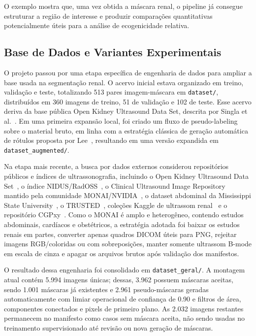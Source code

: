 \documentclass[12pt]{article}
\begin{document}
O exemplo mostra que, uma vez obtida a máscara renal, o pipeline já consegue estruturar a região de interesse e produzir comparações quantitativas potencialmente úteis para a análise de ecogenicidade relativa.

\subsection{Base de Dados e Variantes Experimentais}

O projeto passou por uma etapa específica de engenharia de dados para ampliar a base usada na segmentação renal. O acervo inicial estava organizado em treino, validação e teste, totalizando 513 pares imagem-máscara em \texttt{dataset/}, distribuídos em 360 imagens de treino, 51 de validação e 102 de teste. Esse acervo deriva da base pública Open Kidney Ultrasound Data Set, descrita por Singla et al.~\cite{Singla2023KidneyUS}. Em uma primeira expansão local, foi criado um fluxo de pseudo-labeling sobre o material bruto, em linha com a estratégia clássica de geração automática de rótulos proposta por Lee~\cite{Lee2013PseudoLabel}, resultando em uma versão expandida em \texttt{dataset\_augmented/}.

Na etapa mais recente, a busca por dados externos considerou repositórios públicos e índices de ultrassonografia, incluindo o Open Kidney Ultrasound Data Set~\cite{Singla2023KidneyUS}, o índice NIDUS/RadOSS~\cite{NIDUS2026}, o Clinical Ultrasound Image Repository mantido pela comunidade MONAI/NVIDIA~\cite{MONAIClinicalUltrasound}, o dataset abdominal da Mississippi State University~\cite{Karim2025AbdominalUS}, o TRUSTED~\cite{Ndzimbong2025TRUSTED}, coleções Kaggle de ultrassom renal~\cite{KaurKaggleKidneyStone,BnouiriKaggleRenalData} e o repositório CGPxy~\cite{CGPxyUltrasoundDataset}. Como o MONAI é amplo e heterogêneo, contendo estudos abdominais, cardíacos e obstétricos, a estratégia adotada foi baixar os estudos renais em partes, converter apenas quadros DICOM úteis para PNG, rejeitar imagens RGB/coloridas ou com sobreposições, manter somente ultrassom B-mode em escala de cinza e apagar os arquivos brutos após validação dos manifestos.

O resultado dessa engenharia foi consolidado em \texttt{dataset\_geral/}. A montagem atual contém 5.994 imagens únicas; dessas, 3.962 possuem máscaras aceitas, sendo 1.001 máscaras já existentes e 2.961 pseudo-máscaras geradas automaticamente com limiar operacional de confiança de 0.90 e filtros de área, componentes conectados e pixels de primeiro plano. As 2.032 imagens restantes permanecem no manifesto como casos sem máscara aceita, não sendo usadas no treinamento supervisionado até revisão ou nova geração de máscaras.
\end{document}
